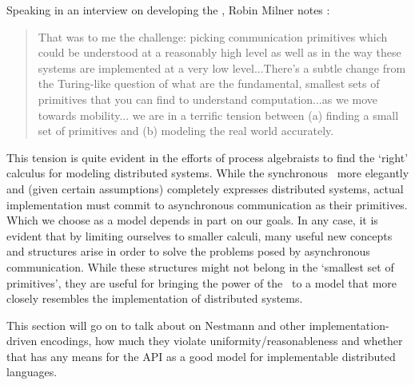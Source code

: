 Speaking in an interview on developing the \picalc, Robin Milner notes \cite{miln03}:
\begin{quote}
That was to me the challenge: picking communication primitives which could be understood at a reasonably high level as well as in the way these systems are implemented at a very low level...There's a subtle change from the Turing-like question of what are the fundamental, smallest sets of primitives that you can find to understand computation...as we move towards mobility... we are in a terrific tension between (a) finding a small set of primitives and (b) modeling the real world accurately.
\end{quote}
This tension is quite evident in the efforts of process algebraists to find the `right' calculus for modeling distributed systems.  
While the synchronous \picalc\ more elegantly and (given certain assumptions) completely expresses distributed systems, actual implementation must commit to asynchronous communication as their primitives.  
Which we choose as a model depends in part on our goals.  
In any case, it is evident that by limiting ourselves to smaller calculi, many useful new concepts and structures arise in order to solve the problems posed by asynchronous communication.  
While these structures might not belong in the `smallest set of primitives', they are useful for bringing the power of the \picalc\ to a model that more closely resembles the implementation of distributed systems.

This section will go on to talk about on Nestmann and other implementation-driven encodings, how much they violate uniformity/reasonableness and whether that has any means for the API as a good model for implementable distributed languages.
